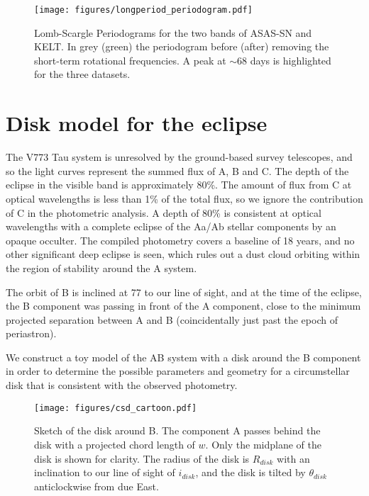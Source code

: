 \documentclass{aa}
\begin{document}
%
\begin{figure}[ht]
    \centering
    \texttt{[image: figures/longperiod\_periodogram.pdf]}
    \caption{Lomb-Scargle Periodograms for the two bands of ASAS-SN and KELT.
    In grey (green) the periodogram before (after) removing the short-term rotational frequencies.
    A peak at $\sim 68$ days is highlighted for the three datasets.}
    \label{fig:long_periodogram}
\end{figure}

\section{Disk model for the eclipse\label{sec:model}}

The V773 Tau system is unresolved by the ground-based survey telescopes, and so the light curves represent the summed flux of A, B and C.
%
The depth of the eclipse in the visible band is approximately 80\%.
%
The amount of flux from C at optical wavelengths is less than 1\% of the total flux, so we ignore the contribution of C in the photometric analysis.
%
A depth of 80\% is consistent at optical wavelengths with a complete eclipse of the Aa/Ab stellar components by an opaque occulter.
%
The compiled photometry covers a baseline of 18 years, and no other significant deep eclipse is seen, which rules out a dust cloud orbiting within the region of stability around the A system.

The orbit of B is inclined at 77\degr{} to our line of sight, and at the time of the eclipse, the B component was passing in front of the A component, close to the minimum projected separation between A and B (coincidentally just past the epoch of periastron).


We construct a toy model of the AB system with a disk around the B component in order to determine the possible parameters and geometry for a circumstellar disk that is consistent with the observed photometry.

\begin{figure}[ht]
\begin{center}
    \centering
    \texttt{[image: figures/csd\_cartoon.pdf]}
    \caption{Sketch of the disk around B.
    The component A passes behind the disk with a projected chord length of $w$.
    Only the midplane of the disk is shown for clarity.
    The radius of the disk is $R_{disk}$ with an inclination to our line of sight of $i_{disk}$, and the disk is tilted by $\theta_{disk}$\degr{} anticlockwise from due East.}
\label{fig:csdcartoon}
\end{center}
\end{figure}
\end{document}
